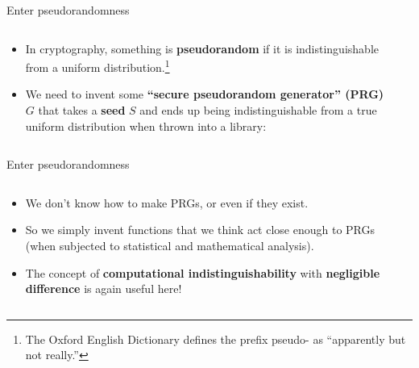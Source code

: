 \documentclass[aspectratio=169, lualatex, handout]{beamer}
\begin{document}
\begin{frame}{Enter pseudorandomness}
	\begin{columns}[c]
		\begin{column}{0.5\textwidth}
			\begin{itemize}[<+->]
				\item In cryptography, something is \textbf{pseudorandom} if it is indistinguishable from a uniform distribution.\footnote{The Oxford English Dictionary defines the prefix pseudo- as ``apparently but not really.''}
				\item We need to invent some \textbf{``secure pseudorandom generator'' (PRG)} $G$ that takes a \textbf{seed} $S$ and ends up being indistinguishable from a true uniform distribution when thrown into a library:
			\end{itemize}
		\end{column}
		\begin{column}{0.5\textwidth}
		\end{column}
	\end{columns}
\end{frame}

\begin{frame}{Enter pseudorandomness}
	\begin{columns}[c]
		\begin{column}{0.5\textwidth}
			\begin{itemize}[<+->]
				\item We don't know how to make PRGs, or even if they exist.
				\item So we simply invent functions that we think act close enough to PRGs (when subjected to statistical and mathematical analysis).
				\item The concept of \textbf{computational indistinguishability} with \textbf{negligible difference} is again useful here!
			\end{itemize}
		\end{column}
		\begin{column}{0.5\textwidth}
		\end{column}
	\end{columns}
\end{frame}
\end{document}
